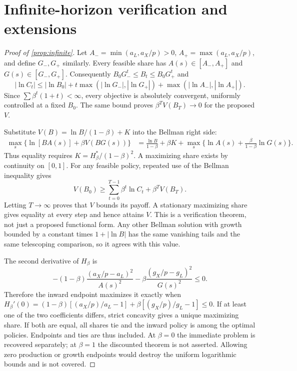 \section{Infinite-horizon verification and extensions}
\label{app:infinite-proof}
\begin{proof}[Proof of \cref{prop:infinite}]
Let $A_-=\min(a_L,a_X/p)>0$, $A_+=\max(a_L,a_X/p)$, and define
$G_-,G_+$ similarly. Every feasible share has $A(s)\in[A_-,A_+]$
and $G(s)\in[G_-,G_+]$. Consequently
$B_0G_-^t\leq B_t\leq B_0G_+^t$ and
\[
 |\ln C_t|\leq |\ln B_0|+
 t\max(|\ln G_-|,|\ln G_+|)+
 \max(|\ln A_-|,|\ln A_+|).
\]
Since $\sum\beta^t(1+t)<\infty$, every objective is absolutely
convergent, uniformly controlled at a fixed $B_0$. The same bound proves
$\beta^T V(B_T)\to0$ for the proposed $V$.

Substitute $V(B)=\ln B/(1-\beta)+K$ into the Bellman right side:
\begin{align*}
 \max_s\{\ln[BA(s)]+\beta V(BG(s))\}
 &=\frac{\ln B}{1-\beta}+\beta K+
 \max_s\{\ln A(s)+\tfrac\beta{1-\beta}\ln G(s)\}.
\end{align*}
Thus equality requires $K=H_\beta^*/(1-\beta)^2$. A maximizing share
exists by continuity on $[0,1]$. For any feasible policy, repeated use of
the Bellman inequality gives
\[
 V(B_0)\geq\sum_{t=0}^{T-1}\beta^t\ln C_t+\beta^TV(B_T).
\]
Letting $T\to\infty$ proves that $V$ bounds its payoff. A stationary
maximizing share gives equality at every step and hence attains $V$.
This is a verification theorem, not just a proposed functional form.
Any other Bellman solution with growth bounded by a constant times
$1+|\ln B|$ has the same vanishing tails and the same telescoping
comparison, so it agrees with this value.

The second derivative of $H_\beta$ is
\[
 -(1-\beta)\frac{(a_X/p-a_L)^2}{A(s)^2}
 -\beta\frac{(g_X/p-g_L)^2}{G(s)^2}\leq0.
\]
Therefore the inward endpoint maximizes it exactly when
$H_\beta'(0)=(1-\beta)[(a_X/p)/a_L-1]+
\beta[(g_X/p)/g_L-1]\leq0$.
If at least one of the two coefficients differs, strict concavity gives
a unique maximizing share. If both are equal, all shares tie and the
inward policy is among the optimal policies. Endpoints and ties are thus
included. At $\beta=0$ the immediate problem is recovered separately;
at $\beta=1$ the discounted theorem is not asserted. Allowing zero
production or growth endpoints would destroy the uniform logarithmic
bounds and is not covered.
\end{proof}

